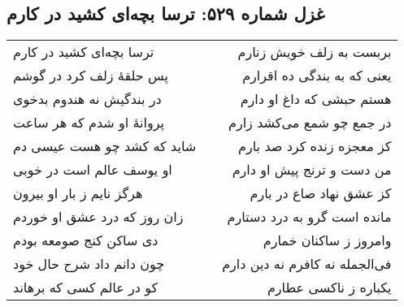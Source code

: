 \begin{center}
\section*{غزل شماره ۵۲۹: ترسا بچه‌ای کشید در کارم}
\label{sec:529}
\begin{longtable}{l p{0.5cm} r}
ترسا بچه‌ای کشید در کارم
&&
بربست به زلف خویش زنارم
\\
پس حلقهٔ زلف کرد در گوشم
&&
یعنی که به بندگی ده اقرارم
\\
در بندگیش نه هندوم بدخوی
&&
هستم حبشی که داغ او دارم
\\
پروانهٔ او شدم که هر ساعت
&&
در جمع چو شمع می‌کشد زارم
\\
شاید که کشد چو هست عیسی دم
&&
کز معجزه زنده کرد صد بارم
\\
او یوسف عالم است در خوبی
&&
من دست و ترنج پیش او دارم
\\
هرگز نایم ز بار او بیرون
&&
کز عشق نهاد صاع در بارم
\\
زان روز که درد عشق او خوردم
&&
مانده است گرو به درد دستارم
\\
دی ساکن کنج صومعه بودم
&&
وامروز ز ساکنان خمارم
\\
چون دانم داد شرح حال خود
&&
فی‌الجمله نه کافرم نه دین دارم
\\
کو در عالم کسی که برهاند
&&
یکباره ز ناکسی عطارم
\\
\end{longtable}
\end{center}
